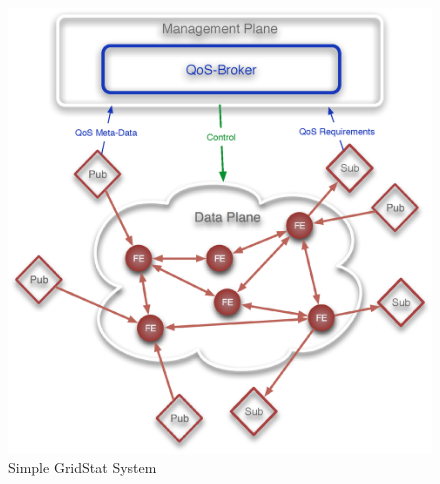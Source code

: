 \documentclass{article}
\begin{document}
\begin{figure}[h]
\begin{center}
\includegraphics[scale=0.51]{GridStatSimple.eps}
\end{center}
\caption{Simple GridStat System}
\end{figure}
\end{document}
